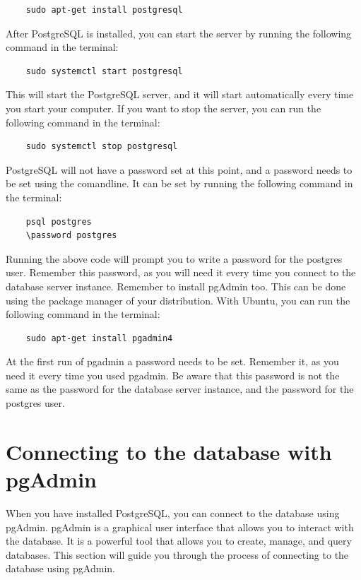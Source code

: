 \begin{verbatim}
    sudo apt-get install postgresql
\end{verbatim}

After PostgreSQL is installed, you can start the server by running the following command in the terminal:

\begin{verbatim}
    sudo systemctl start postgresql
\end{verbatim}

This will start the PostgreSQL server, and it will start automatically every time you start your computer. If you want to stop the server, you can run the following command in the terminal:

\begin{verbatim}
    sudo systemctl stop postgresql
\end{verbatim}

PostgreSQL will not have a password set at this point, and a password needs to be set using the comandline. It can be set by running the following command in the terminal:

\begin{verbatim}
    psql postgres
    \password postgres
\end{verbatim}

Running the above code will prompt you to write a password for the postgres user. Remember this password, as you will need it every time you connect to the database server instance. 
Remember to install pgAdmin too. This can be done using the package manager of your distribution. With Ubuntu, you can run the following command in the terminal:

\begin{verbatim}
    sudo apt-get install pgadmin4
\end{verbatim}

At the first run of pgadmin a password needs to be set. Remember it, as you need it every time you used pgadmin. Be aware that this password is not the same as the password for the database server instance, and the password for the postgres user.

\section{Connecting to the database with pgAdmin}
When you have installed PostgreSQL, you can connect to the database using pgAdmin. pgAdmin is a graphical user interface that allows you to interact with the database. It is a powerful tool that allows you to create, manage, and query databases. This section will guide you through the process of connecting to the database using pgAdmin.

